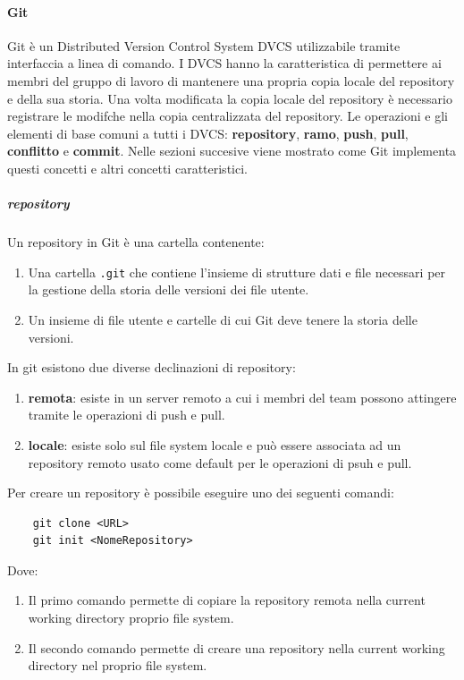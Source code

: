 \paragraph{Git}
Git è un Distributed Version Control System DVCS  utilizzabile tramite interfaccia a linea di comando.
I DVCS hanno la caratteristica di permettere ai membri del gruppo di lavoro di mantenere una propria copia locale del repository e della sua storia.
Una volta modificata la copia locale del repository è necessario registrare le modifche nella copia centralizzata del repository.
Le operazioni e gli elementi di base comuni a tutti i DVCS: \textbf{repository}, \textbf{ramo}, \textbf{push}, \textbf{pull}, \textbf{conflitto} e \textbf{commit}.
Nelle sezioni succesive viene mostrato come Git implementa questi concetti e altri concetti caratteristici.

\subparagraph{repository}
Un repository in Git è una cartella contenente:
\begin{enumerate}
    \item Una cartella \texttt{.git} che contiene l'insieme di strutture dati e file necessari per la gestione della storia delle versioni dei file utente.
    \item Un insieme di file utente e cartelle di cui Git deve tenere la storia delle versioni.
\end{enumerate}
In git esistono due diverse declinazioni di repository:
\begin{enumerate}
    \item \textbf{remota}: esiste in un server remoto a cui i membri del team possono attingere tramite le operazioni di push e pull.
    
    \item \textbf{locale}: esiste solo sul file system locale e può essere associata ad un repository remoto usato come default per le operazioni di psuh e pull. 
\end{enumerate} 
Per creare un repository è possibile eseguire uno dei seguenti comandi:
\begin{lstlisting}
    git clone <URL>
    git init <NomeRepository>
\end{lstlisting}
Dove:
\begin{enumerate}
    \item Il primo comando permette di copiare la repository remota nella current working directory proprio file system.
    \item Il secondo comando permette di creare una repository nella current working directory nel proprio file system.
\end{enumerate}

